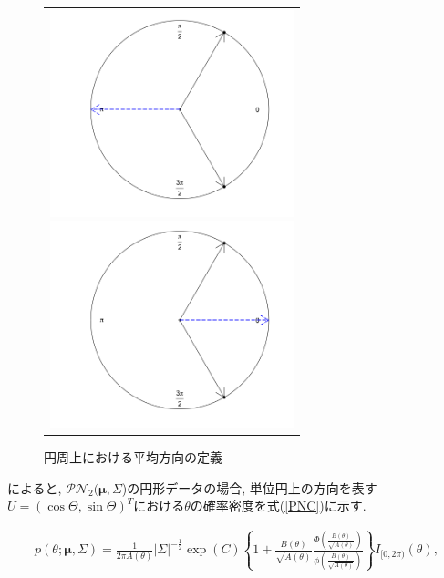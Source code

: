 \documentclass[a4j,12pt]{jarticle}
\begin{document}
\begin{figure}[tbp]
 \begin{tabular}{c}
 \begin{minipage}{0.5\hsize}
  \begin{center}
   \includegraphics[clip,height= 60mm]{data/sample_False.png}
\caption{算術平均による平均の定義}
\label{sample_mu1}
  \end{center}
 \end{minipage}
 \begin{minipage}{0.5\hsize}
  \begin{center}
 \includegraphics[clip,height= 60mm]{data/sample_True.png}
\caption{円周上における平均方向の定義}
\label{sample_mu2}
  \end{center}
 \end{minipage}
\end{tabular}
\label{sample_mu}
\end{figure}

\citet{PN1}によると, $\mathcal{PN}_2(\bm \mu,\Sigma$)の円形データの場合, 単位円上の方向を表す$U = (\cos\Theta, \sin\Theta)^T$における$\theta$の確率密度を式(\ref{PNC})に示す.

\begin{eqnarray}
\label{PNC}
p(\theta; \bm \mu, \Sigma) = \frac{1}{2\pi A(\theta)}|\Sigma|^{-\frac{1}{2}}
\exp(C)\left\{1 + \frac{B(\theta)}{\sqrt{A(\theta)}} \frac{\Phi \left(\frac{B(\theta)}{\sqrt{A(\theta)}}\right)}{\phi \left(\frac{B(\theta)}{\sqrt{A(\theta)}}\right)}\right\} I_{[0,2\pi)}(\theta),
\end{eqnarray}
\end{document}
